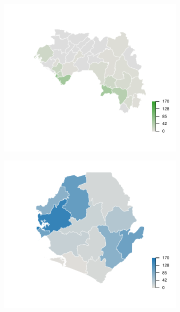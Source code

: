 	\begin{figure}[!p]
		\begin{subfigure}[b]{0.45\textwidth}
			\centering
			\includegraphics[width=\columnwidth]{figures/complete-geo-1}
		\end{subfigure}		
		\hfill
		\begin{subfigure}[b]{0.45\textwidth}
			\centering
			\includegraphics[width=\columnwidth]{figures/complete-geo-2}

\end{subfigure}
\end{figure}
